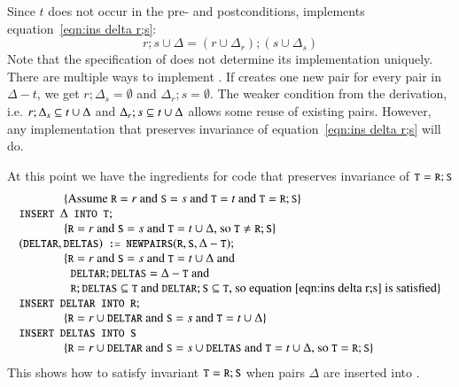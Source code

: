 \documentclass{elsarticle}
\begin{document}
	Since $t$ does not occur in the pre- and postconditions,  implements equation~\ref{eqn:ins delta r;s}:
\begin{equation}
r;s\cup\Delta=(r\cup \Delta_r);(s\cup \Delta_s)\label{eqn:ins delta r;s}
\end{equation}
	Note that the specification of  does not determine its implementation uniquely.
	There are multiple ways to implement .
	If  creates one new pair for every pair in $\Delta-t$,
	we get $r;\Delta_s=\emptyset$ and $\Delta_r;s=\emptyset$.
	The weaker condition from the derivation, i.e. $r;\Delta_s\subseteq t\cup\Delta$ and $\Delta_r;s\subseteq t\cup\Delta$ allows some reuse of existing pairs.
	However, any implementation that preserves invariance of equation~\ref{eqn:ins delta r;s} will do.

	At this point we have the ingredients for code that preserves invariance of $\text{\tt\small T}=\text{\tt\small R};\text{\tt\small S}$
\[\begin{array}{l}
\hspace{0.5in}\{\text{Assume }\code{R}=r\text{ and }\code{S}=s\text{ and }\code{T}=t\text{ and }\code{T}=\code{R};\code{S}\}\\
\code{INSERT }\Delta\code{ INTO T};\\
\hspace{0.5in}\{\code{R}=r\text{ and }\code{S}=s\text{ and }\code{T}=t\cup\Delta\text{, so }\code{T}\neq\code{R};\code{S}\}\\
(\code{DELTAR},\code{DELTAS})\code{ := }\code{NEWPAIRS}(\code{R}, \code{S}, \Delta-\code{T});\\
\hspace{0.5in}\{\code{R}=r\text{ and }\code{S}=s\text{ and }\code{T}=t\cup\Delta\text{ and }\\
\hspace{0.575in}\code{DELTAR};\code{DELTAS}=\Delta-\code{T}\text{ and }\\
\hspace{0.575in}\code{R};\code{DELTAS}\subs\code{T}\text{ and }\code{DELTAR};\code{S}\subs\code{T}\text{, so equation~\ref{eqn:ins delta r;s} is satisfied}\}\\
\code{INSERT DELTAR INTO R};\\
\hspace{0.5in}\{\code{R}=r\cup\code{DELTAR}\text{ and }\code{S}=s\text{ and }\code{T}=t\cup\Delta\}\\
\code{INSERT DELTAS INTO S}\\
\hspace{0.5in}\{\code{R}=r\cup\code{DELTAR}\text{ and }\code{S}=s\cup\code{DELTAS}\text{ and }\code{T}=t\cup\Delta\text{, so }\code{T}=\code{R};\code{S}\}
\end{array}\]
    This shows how to satisfy invariant $\text{\tt\small T}=\text{\tt\small R};\text{\tt\small S}$ when pairs $\Delta$ are inserted into .
\end{document}
